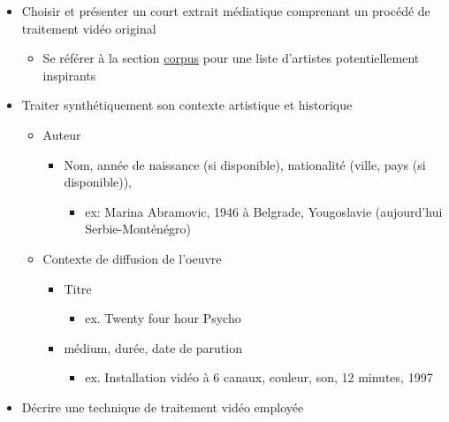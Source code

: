 \documentclass[
]{book}
\providecommand{\tightlist}{%
  \setlength{\itemsep}{0pt}\setlength{\parskip}{0pt}}
\begin{document}
\begin{itemize}
\tightlist
\item
  Choisir et présenter un court extrait médiatique comprenant un procédé de traitement vidéo original

  \begin{itemize}
  \tightlist
  \item
    Se référer à la section \protect\hyperlink{corpus}{corpus} pour une liste d'artistes potentiellement inspirants
  \end{itemize}
\item
  Traiter synthétiquement son contexte artistique et historique

  \begin{itemize}
  \tightlist
  \item
    Auteur

    \begin{itemize}
    \tightlist
    \item
      Nom, année de naissance (si disponible), nationalité (ville, pays (si disponible)),

      \begin{itemize}
      \tightlist
      \item
        ex: Marina Abramovic, 1946 à Belgrade, Yougoslavie (aujourd'hui Serbie-Monténégro)
      \end{itemize}
    \end{itemize}
  \item
    Contexte de diffusion de l'oeuvre

    \begin{itemize}
    \tightlist
    \item
      Titre

      \begin{itemize}
      \tightlist
      \item
        ex. Twenty four hour Psycho
      \end{itemize}
    \item
      médium, durée, date de parution

      \begin{itemize}
      \tightlist
      \item
        ex. Installation vidéo à 6 canaux, couleur, son, 12 minutes, 1997
      \end{itemize}
    \end{itemize}
  \end{itemize}
\item
  Décrire une technique de traitement vidéo employée


\end{itemize}
\end{document}
